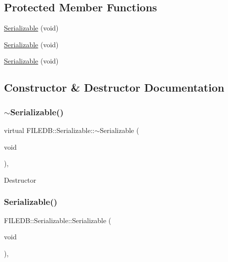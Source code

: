 \subsection*{Protected Member Functions}
\begin{DoxyCompactItemize}
\item 
\mbox{\hyperlink{classFILEDB_1_1Serializable_a09ab427f4720be7429003f4c78adda16}{Serializable}} (void)
\item 
\mbox{\hyperlink{classFILEDB_1_1Serializable_a09ab427f4720be7429003f4c78adda16}{Serializable}} (void)
\item 
\mbox{\hyperlink{classFILEDB_1_1Serializable_a09ab427f4720be7429003f4c78adda16}{Serializable}} (void)
\end{DoxyCompactItemize}


\subsection{Constructor \& Destructor Documentation}
\mbox{\label{classFILEDB_1_1Serializable_aac7656fa828dd044ad98d50cb7de1084}} 
\subsubsection{\texorpdfstring{$\sim$Serializable()}{~Serializable()}\hspace{0.1cm}{\footnotesize\ttfamily [1/3]}}
{\footnotesize\ttfamily virtual F\+I\+L\+E\+D\+B\+::\+Serializable\+::$\sim$\+Serializable (\begin{DoxyParamCaption}\item[{void}]{ }\end{DoxyParamCaption})\hspace{0.3cm}{\ttfamily [inline]}, {\ttfamily [virtual]}}

Destructor \mbox{\label{classFILEDB_1_1Serializable_a09ab427f4720be7429003f4c78adda16}} 
\subsubsection{\texorpdfstring{Serializable()}{Serializable()}\hspace{0.1cm}{\footnotesize\ttfamily [1/3]}}
{\footnotesize\ttfamily F\+I\+L\+E\+D\+B\+::\+Serializable\+::\+Serializable (\begin{DoxyParamCaption}\item[{void}]{ }\end{DoxyParamCaption})\hspace{0.3cm}{\ttfamily [inline]}, {\ttfamily [protected]}}

